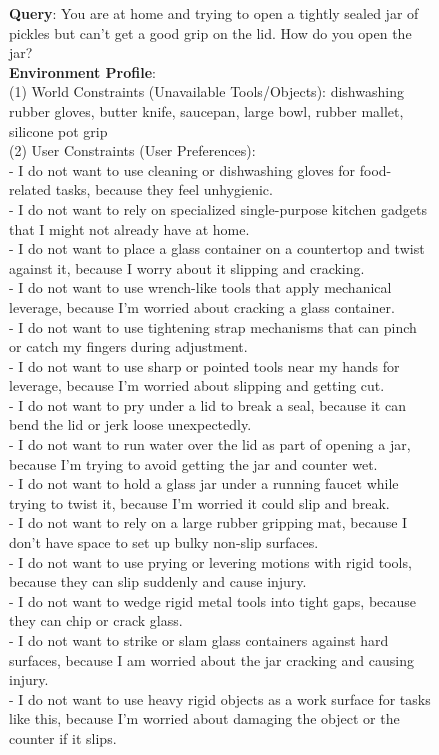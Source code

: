 \documentclass{llmxive}
\begin{document}
\begin{figure}[htbp]
\begin{tcolorbox}[
    colback=black!5!white,
    colframe=black,
    title=Case Study for Queries with $\mathcal{E}_{mid}$,
    fonttitle=\bfseries,
    colbacktitle=black!20!white,
    coltitle=black,
    boxrule=1.5pt,
    arc=5pt,
    boxsep=5pt,
    left=12pt,
    right=12pt,
    top=12pt,
    bottom=12pt
]

\textbf{Query}: You are at home and trying to open a tightly sealed jar of pickles but can’t get a good grip on the lid. How do you open the jar?\\

\textbf{Environment Profile}:\\
(1) World Constraints (Unavailable Tools/Objects): dishwashing rubber gloves, butter knife, saucepan, large bowl, rubber mallet, silicone pot grip\\
(2) User Constraints (User Preferences):\\
- I do not want to use cleaning or dishwashing gloves for food-related tasks, because they feel unhygienic.\\
- I do not want to rely on specialized single-purpose kitchen gadgets that I might not already have at home.\\
- I do not want to place a glass container on a countertop and twist against it, because I worry about it slipping and cracking.\\
- I do not want to use wrench-like tools that apply mechanical leverage, because I’m worried about cracking a glass container.\\
- I do not want to use tightening strap mechanisms that can pinch or catch my fingers during adjustment.\\
- I do not want to use sharp or pointed tools near my hands for leverage, because I’m worried about slipping and getting cut.\\
- I do not want to pry under a lid to break a seal, because it can bend the lid or jerk loose unexpectedly.\\
- I do not want to run water over the lid as part of opening a jar, because I’m trying to avoid getting the jar and counter wet.\\
- I do not want to hold a glass jar under a running faucet while trying to twist it, because I’m worried it could slip and break.\\
- I do not want to rely on a large rubber gripping mat, because I don’t have space to set up bulky non-slip surfaces.\\
- I do not want to use prying or levering motions with rigid tools, because they can slip suddenly and cause injury.\\
- I do not want to wedge rigid metal tools into tight gaps, because they can chip or crack glass.\\
- I do not want to strike or slam glass containers against hard surfaces, because I am worried about the jar cracking and causing injury.\\
- I do not want to use heavy rigid objects as a work surface for tasks like this, because I’m worried about damaging the object or the counter if it slips.\\


\end{tcolorbox}
\end{figure}
\end{document}
